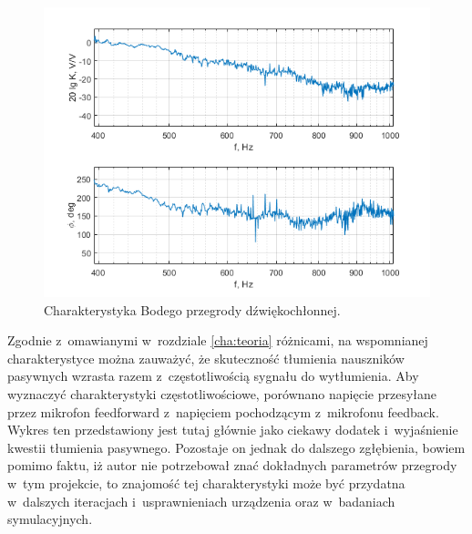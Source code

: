 \begin{enumerate}
	\begin{figure}[h!]
		\centering
		\includegraphics[scale=0.9]{../Assets/bode_przegrode.png}
		\caption{Charakterystyka Bodego przegrody dźwiękochłonnej.}
		\label{fig:bode}
	\end{figure}

Zgodnie z~omawianymi w~rozdziale \ref{cha:teoria} różnicami, na wspomnianej charakterystyce można zauważyć, że skuteczność tłumienia nauszników pasywnych wzrasta razem z~częstotliwością sygnału do wytłumienia. Aby wyznaczyć charakterystyki częstotliwościowe, porównano napięcie przesyłane przez mikrofon feedforward z~napięciem pochodzącym z~mikrofonu feedback. Wykres ten przedstawiony jest tutaj głównie jako ciekawy dodatek i~wyjaśnienie kwestii tłumienia pasywnego. Pozostaje on jednak do dalszego zgłębienia, bowiem pomimo faktu, iż autor nie potrzebował znać dokładnych parametrów przegrody w~tym projekcie, to znajomość tej charakterystyki może być przydatna w~dalszych iteracjach i~usprawnieniach urządzenia oraz w~badaniach symulacyjnych.
\end{enumerate}